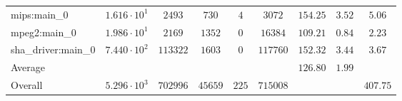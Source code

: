 \begin{tabular}{|l|c|c|c|c|c|c|c|c|}
mips:main\_0            & $ 1.616 \cdot 10^{1}  $ & $ 2493   $ & $ 730   $ & $ 4   $ & $ 3072   $ & $ 154.25      $ & $ 3.52    $ & $ 5.06    $ \\
mpeg2:main\_0           & $ 1.986 \cdot 10^{1}  $ & $ 2169   $ & $ 1352  $ & $ 0   $ & $ 16384  $ & $ 109.21      $ & $ 0.84    $ & $ 2.23    $ \\
sha\_driver:main\_0     & $ 7.440 \cdot 10^{2}  $ & $ 113322 $ & $ 1603  $ & $ 0   $ & $ 117760 $ & $ 152.32      $ & $ 3.44    $ & $ 3.67    $ \\
\hline
Average                 & $                     $ & $        $ & $       $ & $     $ & $        $ & $ 126.80      $ & $ 1.99    $ & $         $ \\
\hline
Overall                 & $ 5.296 \cdot 10^{3}  $ & $ 702996 $ & $ 45659 $ & $ 225 $ & $ 715008 $ & $             $ & $         $ & $ 407.75  $ \\
\hline
\end{tabular}
